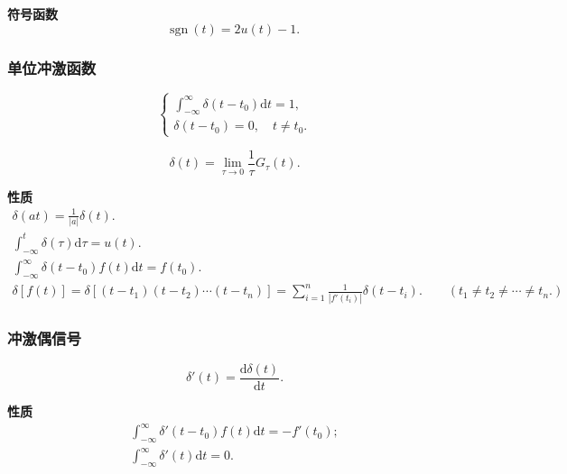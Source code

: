 \textbf{符号函数}
\begin{equation}
    \mathrm{sgn}\ (t)=2u(t)-1.
\end{equation}

\subsubsection{单位冲激函数}

\rmg
\begin{equation}
    \begin{cases}
        \displaystyle\int_{-\infty}^{\infty}\delta(t-t_0)\mathrm{d}t=1, \\
        \delta(t-t_0)=0,\quad t\neq t_0.
    \end{cases}
\end{equation}

\begin{equation}
    \delta(t)=\lim_{\tau\rightarrow 0}\frac{1}{\tau}G_\tau(t).
\end{equation}

\textbf{性质}
\begin{gather}
    \delta(at)=\frac{1}{|a|}\delta(t). \\
    \int_{-\infty}^{t}\delta(\tau)\mathrm{d}\tau=u(t). \\
    \int_{-\infty}^{\infty}\delta(t-t_0)f(t)\mathrm{d}t=f(t_0). \\
    \delta[f(t)]=\delta[(t-t_1)(t-t_2)\cdots(t-t_n)]=\sum_{i=1}^{n}\frac{1}{|f'(t_i)|}\delta(t-t_i).\qquad (t_1\neq t_2 \neq \cdots \neq t_n.)
\end{gather}

\subsubsection{冲激偶信号}

\rmg
\begin{equation}
    \delta'(t)=\frac{\mathrm{d}\delta(t)}{\mathrm{d}t}.
\end{equation}

\textbf{性质}
\begin{gather}
    \int_{-\infty}^{\infty}\delta'(t-t_0)f(t)\mathrm{d}t=-f'(t_0); \\
    \int_{-\infty}^{\infty}\delta'(t)\mathrm{d}t=0.
\end{gather}
